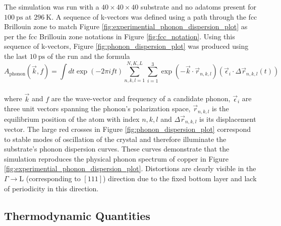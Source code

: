 The simulation was run with a $40\times40\times40$ substrate and no adatoms present for $\SI{100}{\pico\second}$ at $\SI{296}{\kelvin}$. A sequence of k-vectors was defined using a path through the fcc Brillouin zone to match Figure \ref{fig:experimential_phonon_dispersion_plot} as per the fcc Brillouin zone notations in Figure \ref{fig:fcc_notation}. Using this sequence of k-vectors, Figure \ref{fig:phonon_dispersion_plot} was produced using the last $\SI{10}{\pico\second}$ of the run and the formula
\begin{equation}
	A_{\text{phonon}}\left(\vec{k}, f\right) = \int dt \exp\left(-2\pi i ft\right) \sum_{n,k,l=1}^{N,K,L}\sum_{i=1}^3\exp\left(-\vec{k}\cdot\vec{r}_{n,k,l}\right)\left(\vec{\epsilon}_i\cdot\Delta\vec{r}_{n,k,l}\left(t\right)\right)
\end{equation}
\\
where $\vec{k}$ and $f$ are the wave-vector and frequency of a candidate phonon, $\vec{\epsilon}_i$ are three unit vectors spanning the phonon's polarization space, $\vec{r}_{n,k,l}$ is the equilibrium position of the atom with index $n,k,l$ and $\Delta\vec{r}_{n,k,l}$ is its displacement vector. The large red crosses in Figure \ref{fig:phonon_dispersion_plot} correspond to stable modes of oscillation of the crystal and therefore illuminate the substrate's phonon dispersion curves. These curves demonstrate that the simulation reproduces the physical phonon spectrum of copper in Figure \ref{fig:experimential_phonon_dispersion_plot}. Distortions are clearly visible in the $\Gamma\rightarrow\mathrm{L}$ (corresponding to $\left[111\right]$) direction due to the fixed bottom layer and lack of periodicity in this direction. 

\subsection{Thermodynamic Quantities}


